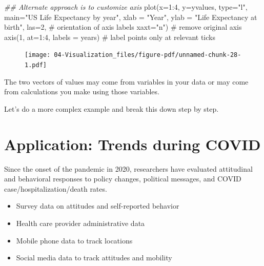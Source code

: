 \documentclass[
  letterpaper,
  DIV=11,
  numbers=noendperiod]{scrreprt}
\newenvironment{Shaded}{\begin{snugshade}}{\end{snugshade}}
\newcommand{\AttributeTok}[1]{\textcolor[rgb]{0.40,0.45,0.13}{#1}}
\newcommand{\CommentTok}[1]{\textcolor[rgb]{0.37,0.37,0.37}{#1}}
\newcommand{\DecValTok}[1]{\textcolor[rgb]{0.68,0.00,0.00}{#1}}
\newcommand{\DocumentationTok}[1]{\textcolor[rgb]{0.37,0.37,0.37}{\textit{#1}}}
\newcommand{\FunctionTok}[1]{\textcolor[rgb]{0.28,0.35,0.67}{#1}}
\newcommand{\NormalTok}[1]{\textcolor[rgb]{0.00,0.23,0.31}{#1}}
\newcommand{\SpecialCharTok}[1]{\textcolor[rgb]{0.37,0.37,0.37}{#1}}
\newcommand{\StringTok}[1]{\textcolor[rgb]{0.13,0.47,0.30}{#1}}
\providecommand{\tightlist}{%
  \setlength{\itemsep}{0pt}\setlength{\parskip}{0pt}}\usepackage{longtable,booktabs,array}
\begin{document}
\begin{Shaded}
\begin{Highlighting}[]
\DocumentationTok{\#\# Alternate approach is to customize axis}
\FunctionTok{plot}\NormalTok{(}\AttributeTok{x=}\DecValTok{1}\SpecialCharTok{:}\DecValTok{4}\NormalTok{,}
     \AttributeTok{y=}\NormalTok{yvalues,}
     \AttributeTok{type=}\StringTok{"l"}\NormalTok{,}
     \AttributeTok{main=}\StringTok{"US Life Expectancy by year"}\NormalTok{,}
     \AttributeTok{xlab =} \StringTok{"Year"}\NormalTok{,}
     \AttributeTok{ylab =} \StringTok{"Life Expectancy at birth"}\NormalTok{,}
     \AttributeTok{las=}\DecValTok{2}\NormalTok{, }\CommentTok{\# orientation of axis labels}
     \AttributeTok{xaxt=}\StringTok{"n"}\NormalTok{) }\CommentTok{\# remove original axis}
\FunctionTok{axis}\NormalTok{(}\DecValTok{1}\NormalTok{, }\AttributeTok{at=}\DecValTok{1}\SpecialCharTok{:}\DecValTok{4}\NormalTok{, }\AttributeTok{labels =}\NormalTok{ years) }\CommentTok{\# label points only at relevant ticks}
\end{Highlighting}
\end{Shaded}

\begin{figure}[H]

{\centering \texttt{[image: 04-Visualization\_files/figure-pdf/unnamed-chunk-28-1.pdf]}

}

\end{figure}

The two vectors of values may come from variables in your data or may
come from calculations you make using those variables.

Let's do a more complex example and break this down step by step.

\hypertarget{application-trends-during-covid}{%
\section{Application: Trends during
COVID}\label{application-trends-during-covid}}

Since the onset of the pandemic in 2020, researchers have evaluated
attitudinal and behavioral responses to policy changes, political
messages, and COVID case/hospitalization/death rates.

\begin{itemize}
\tightlist
\item
  Survey data on attitudes and self-reported behavior
\item
  Health care provider administrative data
\item
  Mobile phone data to track locations
\item
  Social media data to track attitudes and mobility
\end{itemize}
\end{document}
